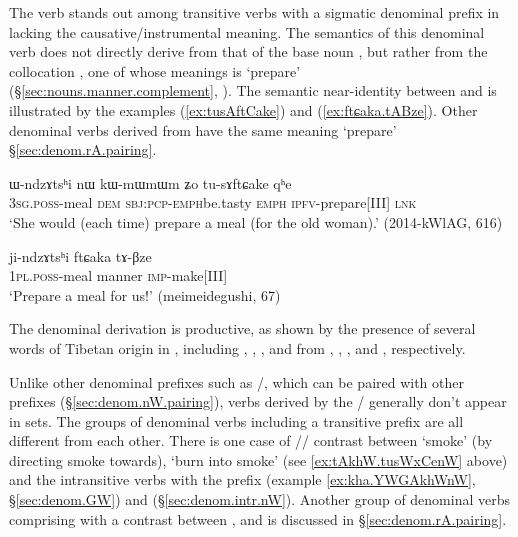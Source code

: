 The verb  stands out among transitive verbs with  a sigmatic denominal prefix in lacking the causative/instrumental meaning. The semantics of this denominal verb does not directly derive from that of the base noun , but rather from the collocation , one of whose meanings is `prepare' (§\ref{sec:nouns.manner.complement}, \citealt[240]{jacques16complementation}). The semantic near-identity between  and  is illustrated by the examples (\ref{ex:tusAftCake}) and (\ref{ex:ftɕaka.tABze}). Other denominal verbs derived from  have the same meaning `prepare'  §\ref{sec:denom.rA.pairing}.


\begin{exe}
\ex \label{ex:tusAftCake}
 \gll ɯ-ndzɤtsʰi nɯ kɯ-mɯ\redp{}mɯm ʑo tu-sɤftɕake qʰe \\
 \textsc{3sg}.\textsc{poss}-meal \textsc{dem} \textsc{sbj}:\textsc{pcp}-\textsc{emph}\redp{}be.tasty \textsc{emph} \textsc{ipfv}-prepare[III] \textsc{lnk} \\
 \glt `She would (each time) prepare a meal (for the old woman).' (2014-kWlAG, 616)
\end{exe}
 
 \begin{exe}
\ex \label{ex:ftɕaka.tABze}
 \gll  ji-ndzɤtsʰi ftɕaka tɤ-βze \\
 \textsc{1pl}.\textsc{poss}-meal manner \textsc{imp}-make[III] \\
 \glt  `Prepare a meal for us!' (meimeidegushi, 67)
\end{exe}

The   denominal derivation is productive, as shown by the presence of several words of Tibetan origin in , including , , ,  and   from , , ,  and , respectively.
  
Unlike other denominal prefixes such as /, which can be paired with other prefixes (§\ref{sec:denom.nW.pairing}), verbs derived by the / generally don't appear in sets. The groups of denominal verbs including a transitive  prefix are all different from each other. There is one case of // contrast between  `smoke' (by directing smoke towards), `burn into smoke' (see \ref{ex:tAkhW.tusWxCenW} above) and the intransitive verbs  with the  prefix (example \ref{ex:kha.YWGAkhWnW}, §\ref{sec:denom.GW}) and  (§\ref{sec:denom.intr.nW}). Another group of denominal verbs comprising  with a contrast between ,  and  is discussed in §\ref{sec:denom.rA.pairing}.


